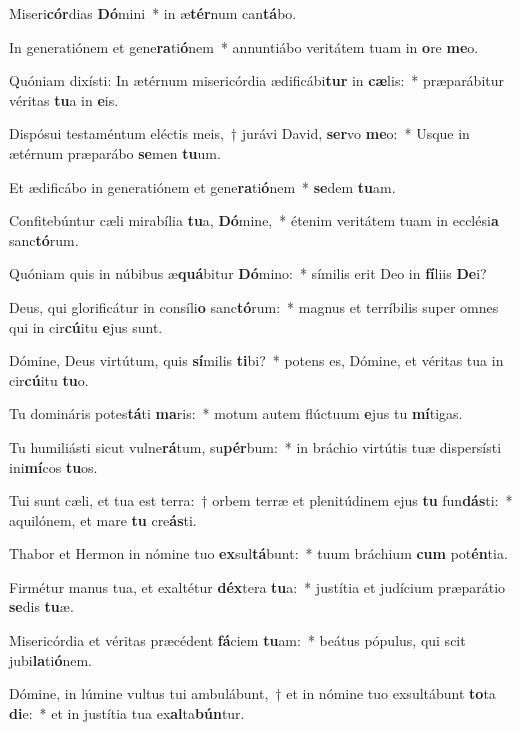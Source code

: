 \item Miseri\textbf{cór}dias \textbf{Dó}mini~* in æ\textbf{tér}num can\textbf{tá}bo.
\item In generatiónem et gene\textbf{ra}ti\textbf{ó}nem~* annuntiábo veritátem tuam in \textbf{o}re \textbf{me}o.
\item Quóniam dixísti: In ætérnum misericórdia ædificábi\textbf{tur} in \textbf{cæ}lis:~* præparábitur véritas \textbf{tu}a in \textbf{e}is.
\item Dispósui testaméntum eléctis meis,~† jurávi David, \textbf{ser}vo \textbf{me}o:~* Usque in ætérnum præparábo \textbf{se}men \textbf{tu}um.
\item Et ædificábo in generatiónem et gene\textbf{ra}ti\textbf{ó}nem~* \textbf{se}dem \textbf{tu}am.
\item Confitebúntur cæli mirabília \textbf{tu}a, \textbf{Dó}mine,~* étenim veritátem tuam in ecclési\textbf{a} sanc\textbf{tó}rum.
\item Quóniam quis in núbibus æ\textbf{quá}bitur \textbf{Dó}mino:~* símilis erit Deo in \textbf{fí}liis \textbf{De}i?
\item Deus, qui glorificátur in consíli\textbf{o} sanc\textbf{tó}rum:~* magnus et terríbilis super omnes qui in cir\textbf{cú}itu \textbf{e}jus sunt.
\item Dómine, Deus virtútum, quis \textbf{sí}milis \textbf{ti}bi?~* potens es, Dómine, et véritas tua in cir\textbf{cú}itu \textbf{tu}o.
\item Tu domináris potes\textbf{tá}ti \textbf{ma}ris:~* motum autem flúctuum \textbf{e}jus tu \textbf{mí}tigas.
\item Tu humiliásti sicut vulne\textbf{rá}tum, su\textbf{pér}bum:~* in bráchio virtútis tuæ dispersísti ini\textbf{mí}cos \textbf{tu}os.
\item Tui sunt cæli, et tua est terra:~† orbem terræ et plenitúdinem ejus \textbf{tu} fun\textbf{dás}ti:~* aquilónem, et mare \textbf{tu} cre\textbf{ás}ti.
\item Thabor et Hermon in nómine tuo \textbf{ex}sul\textbf{tá}bunt:~* tuum bráchium \textbf{cum} pot\textbf{én}tia.
\item Firmétur manus tua, et exaltétur \textbf{déx}tera \textbf{tu}a:~* justítia et judícium præparátio \textbf{se}dis \textbf{tu}æ.
\item Misericórdia et véritas præcédent \textbf{fá}ciem \textbf{tu}am:~* beátus pópulus, qui scit jubi\textbf{la}ti\textbf{ó}nem.
\item Dómine, in lúmine vultus tui ambulábunt,~† et in nómine tuo exsultábunt \textbf{to}ta \textbf{di}e:~* et in justítia tua ex\textbf{al}ta\textbf{bún}tur.

